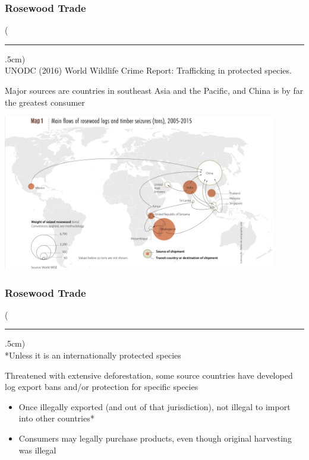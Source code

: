 \documentclass[10pt]{beamer}
\newenvironment{reference}[2]{%
	\begin{textblock*}{\textwidth}(#1,#2)
		\tiny\bgroup\color{gray}}{\egroup\end{textblock*}}
\begin{document}
\begin{frame}[t]
\frametitle{Rosewood Trade}
\vspace{0.25cm}

	\begin{reference}{4mm}{92mm}
		\rule{1.5cm}{0.25pt}\\
		UNODC (2016) World Wildlife Crime Report: Trafficking in protected species.
	\end{reference}
	
	Major \textcolor{myblue}{sources} are countries in southeast Asia and the Pacific, and China is by far the greatest \textcolor{myblue}{consumer}\\
	
	\vspace{0.5cm}
	
	\begin{center}
		\includegraphics[width=0.9\textwidth]{figures/map1.png}
	\end{center}
\end{frame}


\begin{frame}[t]
\frametitle{Rosewood Trade}
\vspace{0.5cm}

	\begin{reference}{4mm}{92mm}
		\rule{1.5cm}{0.25pt}\\
		*Unless it is an internationally protected species
	\end{reference}
	
	
	Threatened with extensive deforestation, some source countries have developed log export bans and/or protection for specific species\\
	
	\vspace{0.25cm}
	
	\begin{itemize}
		\item Once illegally exported (and out of that jurisdiction), not illegal to import into other countries*
		\medskip
		\item Consumers may legally purchase products, even though original harvesting was illegal
	\end{itemize}
\end{frame}
\end{document}
